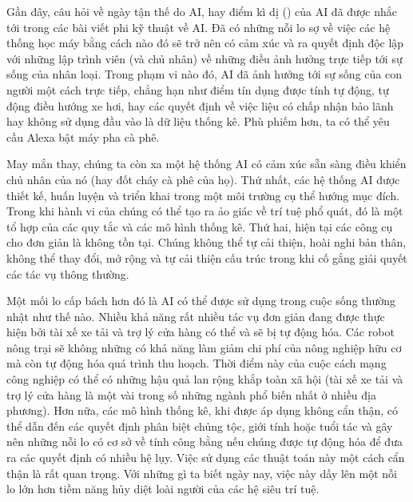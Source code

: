 \documentclass[letterpaper,11pt,english]{sphinxmanual}
\begin{document}
Gần đây, câu hỏi về ngày tận thế do AI, hay điểm kì dị ()
của AI đã được nhắc tới trong các bài viết phi kỹ thuật về AI. Đã có
những nỗi lo sợ về việc các hệ thống học máy bằng cách nào đó sẽ trở nên
có cảm xúc và ra quyết định độc lập với những lập trình viên (và chủ
nhân) về những điều ảnh hưởng trực tiếp tới sự sống của nhân loại. Trong
phạm vi nào đó, AI đã ảnh hưởng tới sự sống của con người một cách trực
tiếp, chẳng hạn như điểm tín dụng được tính tự động, tự động điều hướng
xe hơi, hay các quyết định về việc liệu có chấp nhận bảo lãnh hay không
sử dụng đầu vào là dữ liệu thống kê. Phù phiếm hơn, ta có thể yêu cầu
Alexa bật máy pha cà phê.



May mắn thay, chúng ta còn xa một hệ thống AI có cảm xúc sẵn sàng điều
khiển chủ nhân của nó (hay đốt cháy cà phê của họ). Thứ nhất, các hệ
thống AI được thiết kế, huấn luyện và triển khai trong một môi trường cụ
thể hướng mục đích. Trong khi hành vi của chúng có thể tạo ra ảo giác về
trí tuệ phổ quát, đó là một tổ hợp của các quy tắc và các mô hình thống
kê. Thứ hai, hiện tại các công cụ cho  đơn
giản là không tồn tại. Chúng không thể tự cải thiện, hoài nghi bản thân,
không thể thay đổi, mở rộng và tự cải thiện cấu trúc trong khi cố gắng
giải quyết các tác vụ thông thường.



Một mối lo cấp bách hơn đó là AI có thể được sử dụng trong cuộc sống
thường nhật như thế nào. Nhiều khả năng rất nhiều tác vụ đơn giản đang
được thực hiện bởi tài xế xe tải và trợ lý cửa hàng có thể và sẽ bị tự
động hóa. Các robot nông trại sẽ không những có khả năng làm giảm chi
phí của nông nghiệp hữu cơ mà còn tự động hóa quá trình thu hoạch. Thời
điểm này của cuộc cách mạng công nghiệp có thể có những hậu quả lan rộng
khắp toàn xã hội (tài xế xe tải và trợ lý cửa hàng là một vài trong số
những ngành phổ biến nhất ở nhiều địa phương). Hơn nữa, các mô hình
thống kê, khi được áp dụng không cẩn thận, có thể dẫn đến các quyết định
phân biệt chủng tộc, giới tính hoặc tuổi tác và gây nên những nỗi lo có
cơ sở về tính công bằng nếu chúng được tự động hóa để đưa ra các quyết
định có nhiều hệ lụy. Việc sử dụng các thuật toán này một cách cẩn thận
là rất quan trọng. Với những gì ta biết ngày nay, việc này dấy lên một
nỗi lo lớn hơn tiềm năng hủy diệt loài người của các hệ siêu trí tuệ.
\end{document}
